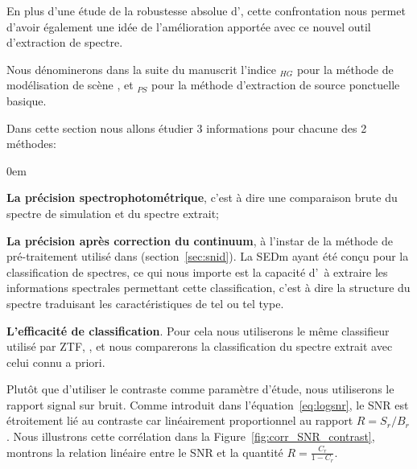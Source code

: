 \documentclass[../main/main.tex]{subfiles}
\begin{document}
En plus d'une étude de la robustesse absolue d'\hypergal, cette
confrontation nous permet d'avoir également une idée de l'amélioration
apportée avec ce nouvel outil d'extraction de spectre.

Nous dénominerons dans la suite du manuscrit l'indice $_{HG}$ pour la
méthode de modélisation de scène \hypergal, et $_{PS}$ pour la méthode
d'extraction de source ponctuelle basique.

Dans cette section nous allons étudier 3 informations pour chacune des 2
méthodes:

\begin{itemize}[label=$\diamondsuit$]
  \itemsep0em
 \begin{samepage}
\item \textbf{La précision spectrophotométrique}, c'est à dire une
  comparaison brute du spectre de simulation et du spectre extrait;
\item \textbf{La précision après correction du continuum}, à l'instar de
  la méthode de pré-traitement utilisé dans 
  (section~\ref{sec:snid}). La SEDm ayant été conçu pour la
  classification de spectres, ce qui nous importe est la
  capacité d'\hypergal\ à extraire les informations spectrales
  permettant cette classification, c'est à dire la structure du spectre
  traduisant les caractéristiques de tel ou tel type.
\item \textbf{L'efficacité de classification}. Pour cela nous
  utiliserons le même classifieur utilisé par ZTF, , et nous
  comparerons la classification du spectre extrait avec celui connu a priori.
  \end{samepage}
\end{itemize}

Plutôt que d'utiliser le contraste comme paramètre d'étude, nous
utiliserons le rapport signal sur bruit. Comme introduit dans
l'équation~\ref{eq:logsnr}, le SNR est étroitement lié au
contraste car linéairement proportionnel au rapport $R=S_{r}/B_{r}$. Nous illustrons cette corrélation dans la
Figure~\ref{fig:corr_SNR_contrast}, montrons la relation linéaire entre
le SNR et la quantité $R=\frac{C_{r}}{1-C_{r}}$.
\end{document}
